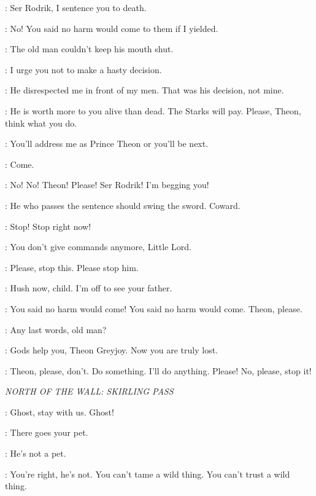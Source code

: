 \THEON: Ser Rodrik, I sentence you to death. 

\BRAN: No! You said no harm would come to them if I yielded. 

\THEON: The old man couldn't keep his mouth shut. 

\LUWIN: I urge you not to make a hasty decision. 

\THEON: He disrespected me in front of my men. That was his decision, not mine. 

\LUWIN: He is worth more to you alive than dead. The Starks will pay. Please, Theon, think what you do. 

\THEON:  You'll address me as Prince Theon or you'll be next. 

\DAGMER: Come. 


\BRAN: No! No! Theon! Please! Ser Rodrik! I'm begging you!


\RODRIK: He who passes the sentence should swing the sword. Coward. 


\BRAN: Stop! Stop right now! 

\THEON: You don't give commands anymore, Little Lord. 

\BRAN: Please, stop this. Please stop him. 

\RODRIK: Hush now, child. I'm off to see your father. 

\BRAN: You said no harm would come! You said no harm would come. Theon, please. 

\THEON: Any last words, old man? 

\RODRIK: Gods help you, Theon Greyjoy. Now you are truly lost. 

\BRAN: Theon, please, don't. Do something. I'll do anything. Please! No, please, stop it! 



\scene

\textit{NORTH OF THE WALL: SKIRLING PASS}


\JON: Ghost, stay with us. Ghost! 

\HALFHAND: There goes your pet. 

\JON: He's not a pet. 

\HALFHAND: You're right, he's not. You can't tame a wild thing. You can't trust a wild thing. 

